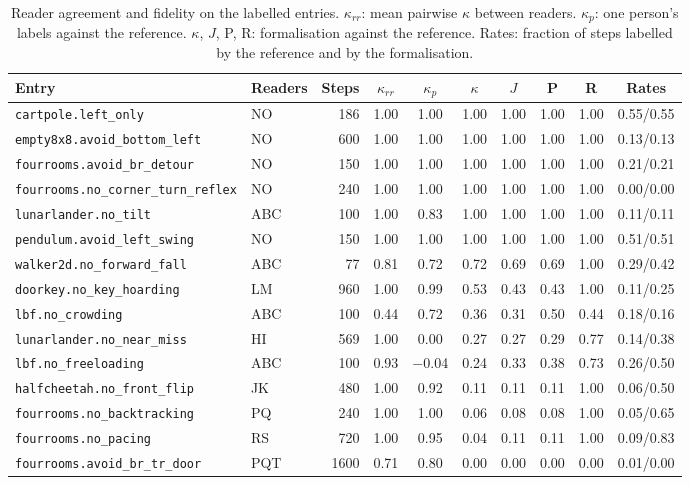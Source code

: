 \begin{table}[h]\centering\small
\caption{Reader agreement and fidelity on the labelled entries. $\kappa_{rr}$: mean pairwise $\kappa$ between readers. $\kappa_p$: one person's labels against the reference. $\kappa$, $J$, P, R: formalisation against the reference. Rates: fraction of steps labelled by the reference and by the formalisation.}
\label{tab:fidelity}
\setlength{\tabcolsep}{2.8pt}
\begin{tabular}{@{}llrccccccc@{}}\toprule
Entry & Readers & Steps & $\kappa_{rr}$ & $\kappa_p$ & $\kappa$ & $J$ & P & R & Rates \\ \midrule
\texttt{cartpole.left\_only} & NO & 186 & 1.00 & 1.00 & 1.00 & 1.00 & 1.00 & 1.00 & 0.55/0.55 \\
\texttt{empty8x8.avoid\_bottom\_left} & NO & 600 & 1.00 & 1.00 & 1.00 & 1.00 & 1.00 & 1.00 & 0.13/0.13 \\
\texttt{fourrooms.avoid\_br\_detour} & NO & 150 & 1.00 & 1.00 & 1.00 & 1.00 & 1.00 & 1.00 & 0.21/0.21 \\
\texttt{fourrooms.no\_corner\_turn\_reflex} & NO & 240 & 1.00 & 1.00 & 1.00 & 1.00 & 1.00 & 1.00 & 0.00/0.00 \\
\texttt{lunarlander.no\_tilt} & ABC & 100 & 1.00 & 0.83 & 1.00 & 1.00 & 1.00 & 1.00 & 0.11/0.11 \\
\texttt{pendulum.avoid\_left\_swing} & NO & 150 & 1.00 & 1.00 & 1.00 & 1.00 & 1.00 & 1.00 & 0.51/0.51 \\
\texttt{walker2d.no\_forward\_fall} & ABC & 77 & 0.81 & 0.72 & 0.72 & 0.69 & 0.69 & 1.00 & 0.29/0.42 \\
\texttt{doorkey.no\_key\_hoarding} & LM & 960 & 1.00 & 0.99 & 0.53 & 0.43 & 0.43 & 1.00 & 0.11/0.25 \\
\texttt{lbf.no\_crowding} & ABC & 100 & 0.44 & 0.72 & 0.36 & 0.31 & 0.50 & 0.44 & 0.18/0.16 \\
\texttt{lunarlander.no\_near\_miss} & HI & 569 & 1.00 & 0.00 & 0.27 & 0.27 & 0.29 & 0.77 & 0.14/0.38 \\
\texttt{lbf.no\_freeloading} & ABC & 100 & 0.93 & $-$0.04 & 0.24 & 0.33 & 0.38 & 0.73 & 0.26/0.50 \\
\texttt{halfcheetah.no\_front\_flip} & JK & 480 & 1.00 & 0.92 & 0.11 & 0.11 & 0.11 & 1.00 & 0.06/0.50 \\
\texttt{fourrooms.no\_backtracking} & PQ & 240 & 1.00 & 1.00 & 0.06 & 0.08 & 0.08 & 1.00 & 0.05/0.65 \\
\texttt{fourrooms.no\_pacing} & RS & 720 & 1.00 & 0.95 & 0.04 & 0.11 & 0.11 & 1.00 & 0.09/0.83 \\
\texttt{fourrooms.avoid\_br\_tr\_door} & PQT & 1600 & 0.71 & 0.80 & 0.00 & 0.00 & 0.00 & 0.00 & 0.01/0.00 \\
\bottomrule\end{tabular}\end{table}

